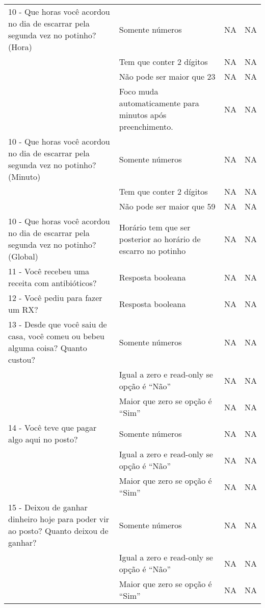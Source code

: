 \begin{longtable}{|p{}|p{}|p{}|p{}|}
10 - Que horas você acordou no dia de escarrar pela segunda vez no potinho? (Hora) & Somente números & NA & NA \\ \cline{2-4}  & Tem que conter 2 dígitos & NA & NA \\ \cline{2-4} & Não pode ser maior que 23 & NA & NA \\ \cline{2-4} & Foco muda automaticamente para minutos após preenchimento.  & NA & NA \\ \hline
10 - Que horas você acordou no dia de escarrar pela segunda vez no potinho? (Minuto) & Somente números & NA & NA \\ \cline{2-4}  & Tem que conter 2 dígitos & NA & NA \\ \cline{2-4} & Não pode ser maior que 59 & NA & NA \\ \hline
10 - Que horas você acordou no dia de escarrar pela segunda vez no potinho? (Global) & Horário tem que ser posterior ao horário de escarro no potinho & NA & NA \\ \hline

11 - Você recebeu uma receita com antibióticos? & Resposta booleana & NA & NA \\ \hline

12 - Você pediu para fazer um RX? & Resposta booleana & NA & NA \\ \hline

13 - Desde que você saiu de casa, você comeu ou bebeu alguma coisa? Quanto custou? & Somente números & NA & NA \\ \cline{2-4} & Igual a zero e read-only se opção é ``Não'' & NA & NA \\ \cline{2-4} & Maior que zero se opção é ``Sim'' & NA & NA \\ \hline

14 - Você teve que pagar algo aqui no posto? & Somente números & NA & NA \\ \cline{2-4} & Igual a zero e read-only se opção é ``Não'' & NA & NA \\ \cline{2-4} & Maior que zero se opção é ``Sim'' & NA & NA \\ \hline

15 - Deixou de ganhar dinheiro hoje para poder vir ao posto? Quanto deixou de ganhar? & Somente números & NA & NA \\ \cline{2-4} & Igual a zero e read-only se opção é ``Não'' & NA & NA \\ \cline{2-4} & Maior que zero se opção é ``Sim'' & NA & NA \\ \hline


\end{longtable}
